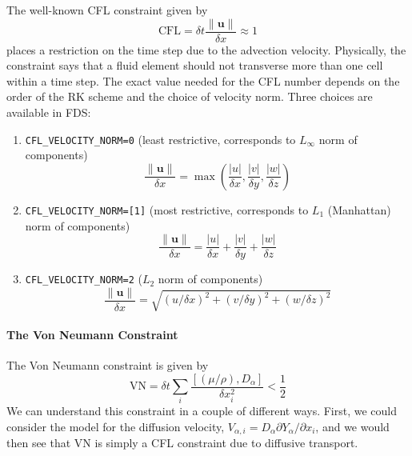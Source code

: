 \documentclass[11pt]{article}
\begin{document}
The well-known CFL constraint given by
\begin{equation}
\mbox{CFL} = \delta t \frac{\|\mathbf{u}\|}{\delta x} \approx 1
\end{equation}
places a restriction on the time step due to the advection velocity. Physically, the constraint says that a fluid element should not transverse more than one cell within a time step. The exact value needed for the CFL number depends on the order of the RK scheme and the choice of velocity norm. Three choices are available in FDS:
\begin{enumerate}
\item[]{\tt CFL\_VELOCITY\_NORM=0} (least restrictive, corresponds to $L_\infty$ norm of components) 
    \begin{equation}
    \frac{\|\mathbf{u}\|}{\delta x} = \max \left(\frac{|u|}{\delta x}, \frac{|v|}{\delta y}, \frac{|w|}{\delta z}\right)
    \end{equation}
\item[]{\tt CFL\_VELOCITY\_NORM=[1]} (most restrictive, corresponds to $L_1$ (Manhattan) norm of components)
    \begin{equation}
    \frac{\|\mathbf{u}\|}{\delta x} = \frac{|u|}{\delta x}+\frac{|v|}{\delta y}+\frac{|w|}{\delta z}
    \end{equation}
\item[]{\tt CFL\_VELOCITY\_NORM=2} ($L_2$ norm of components)
    \begin{equation}
    \frac{\|\mathbf{u}\|}{\delta x} = \sqrt{ (u/\delta x)^2+(v/\delta y)^2+(w/\delta z)^2 }
    \end{equation}
\end{enumerate}


\paragraph{The Von Neumann Constraint}

The Von Neumann constraint is given by
\begin{equation}
\mbox{VN} = \delta t \sum_i \frac{[(\mu/\rho),D_\alpha]}{\delta x_i^2} < \frac{1}{2}
\end{equation}
We can understand this constraint in a couple of different ways.  First, we could consider the model for the diffusion velocity, $V_{\alpha,i} = D_\alpha \partial Y_\alpha/\partial x_i$, and we would then see that VN is simply a CFL constraint due to diffusive transport.
\end{document}
